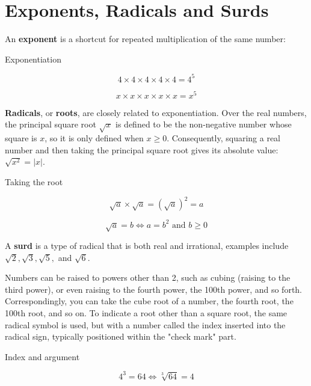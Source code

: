 \section{Exponents, Radicals and Surds}
An \textbf{exponent} is a shortcut for repeated multiplication of the same number:

\begin{example} Exponentiation

\[
4 \times 4 \times 4 \times 4 \times 4 = 4^5
\]

\[
x \times x \times x \times x \times x = x^5
\]  
\end{example}

\textbf{Radicals}, or \textbf{roots}, are closely related to exponentiation. Over the real numbers, the principal square root \(\sqrt{x}\) is defined to be the non-negative number whose square is \(x\), so it is only defined when \(x\geq 0\). Consequently, squaring a real number and then taking the principal square root gives its absolute value: \(\sqrt{x^2}=|x|\).

\begin{example} Taking the root

\[
\sqrt{a} \times \sqrt{a} = (\sqrt{a})^2 = a
\]

\[
\sqrt{a} = b \iff a = b^2 \text{ and } b\geq 0
\]    
\end{example}



A \textbf{surd} is a type of radical that is both real and irrational, examples include \(\sqrt{2}, \sqrt{3}, \sqrt{5},\) and \(\sqrt{6}\).

Numbers can be raised to powers other than 2, such as cubing (raising to the third power), or even raising to the fourth power, the 100th power, and so forth. Correspondingly, you can take the cube root of a number, the fourth root, the 100th root, and so on. To indicate a root other than a square root, the same radical symbol is used, but with a number called the index inserted into the radical sign, typically positioned within the "check mark" part.

\begin{example} Index and argument

\[
4^3 = 64 \iff \sqrt[3]{64} = 4
\]
   
\end{example}


